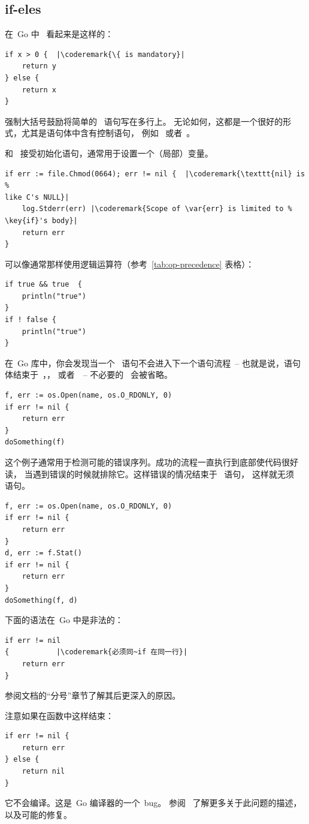 \subsection{if-eles}
在~Go 中~ 看起来是这样的：
\begin{lstlisting}
if x > 0 {	|\coderemark{\{ is mandatory}|
    return y
} else {
    return x
}
\end{lstlisting}
强制大括号鼓励将简单的~ 语句写在多行上。
无论如何，这都是一个很好的形式，尤其是语句体中含有控制语句，
例如~ 或者~。

 和~ 接受初始化语句，通常用于设置一个（局部）变量。
\begin{lstlisting}
if err := file.Chmod(0664); err != nil {  |\coderemark{\texttt{nil} is %
like C's NULL}|
    log.Stderr(err) |\coderemark{Scope of \var{err} is limited to %
\key{if}'s body}|
    return err
}
\end{lstlisting}
可以像通常那样使用逻辑运算符（参考~\ref{tab:op-precedence} 表格）：
\begin{lstlisting}
if true && true  {
    println("true")
}
if ! false {
    println("true")
}
\end{lstlisting}

在~Go 库中，你会发现当一个~ 语句不会进入下一个语句流程~-- 
也就是说，语句体结束于~，，
或者~~-- 不必要的~ 会被省略。

\begin{lstlisting}
f, err := os.Open(name, os.O_RDONLY, 0)
if err != nil {
    return err
}
doSomething(f)
\end{lstlisting}
这个例子通常用于检测可能的错误序列。成功的流程一直执行到底部使代码很好读，
当遇到错误的时候就排除它。这样错误的情况结束于~ 语句，
这样就无须~ 语句。
\begin{lstlisting}
f, err := os.Open(name, os.O_RDONLY, 0)
if err != nil {
    return err
}
d, err := f.Stat()
if err != nil {
    return err
}
doSomething(f, d)
\end{lstlisting}
下面的语法在~Go 中是非法的：
\begin{lstlisting}
if err != nil
{		    |\coderemark{必须同~if 在同一行}|
    return err
}
\end{lstlisting}
参阅文档\cite{effective_go}的``分号''章节了解其后更深入的原因。

\begin{lbar}
注意如果在函数中这样结束：
\begin{lstlisting}
if err != nil {
    return err
} else {
    return nil
}
\end{lstlisting}
它不会编译。这是~Go 编译器的一个~bug。
参阅~\cite{go_issue_65} 了解更多关于此问题的描述，以及可能的修复。
\end{lbar}

